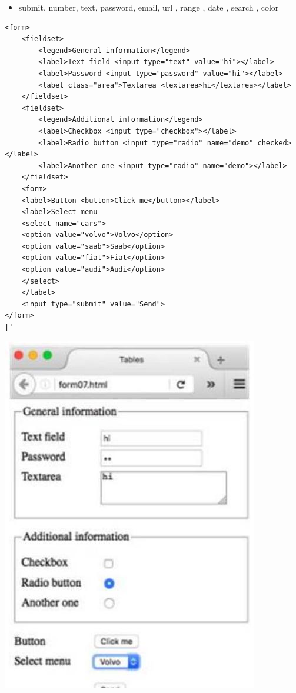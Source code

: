 \begin{itemize}
  \item submit, number, text, password, email, url , range , date , search , color
\end{itemize}

\begin{verbatim}
<form>
    <fieldset>
        <legend>General information</legend>
        <label>Text field <input type="text" value="hi"></label>
        <label>Password <input type="password" value="hi"></label>
        <label class="area">Textarea <textarea>hi</textarea></label>
    </fieldset>
    <fieldset>
        <legend>Additional information</legend>
        <label>Checkbox <input type="checkbox"></label>
        <label>Radio button <input type="radio" name="demo" checked></label>
        <label>Another one <input type="radio" name="demo"></label>
    </fieldset>
    <form>
    <label>Button <button>Click me</button></label>
    <label>Select menu
    <select name="cars">
    <option value="volvo">Volvo</option>
    <option value="saab">Saab</option>
    <option value="fiat">Fiat</option>
    <option value="audi">Audi</option>
    </select>
    </label>
    <input type="submit" value="Send">
</form>
|'
\end{verbatim}

\begin{center}
\includegraphics[width=\linewidth]{images/2024_12_29_858f09cde51177c71657g-29}
\end{center}

